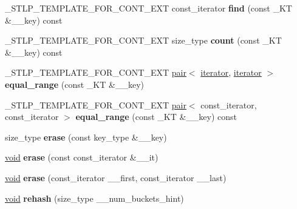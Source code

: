 \begin{DoxyCompactItemize}
\+\_\+\+S\+T\+L\+P\+\_\+\+T\+E\+M\+P\+L\+A\+T\+E\+\_\+\+F\+O\+R\+\_\+\+C\+O\+N\+T\+\_\+\+E\+XT const\+\_\+iterator {\bfseries find} (const \+\_\+\+KT \&\+\_\+\+\_\+key) const
\item 
\mbox{\label{classhashtable_af285e0578bbb1cf071b11e26476e820f}} 
\+\_\+\+S\+T\+L\+P\+\_\+\+T\+E\+M\+P\+L\+A\+T\+E\+\_\+\+F\+O\+R\+\_\+\+C\+O\+N\+T\+\_\+\+E\+XT size\+\_\+type {\bfseries count} (const \+\_\+\+KT \&\+\_\+\+\_\+key) const
\item 
\mbox{\label{classhashtable_ac454537f2e28b45372646c382e98984a}} 
\+\_\+\+S\+T\+L\+P\+\_\+\+T\+E\+M\+P\+L\+A\+T\+E\+\_\+\+F\+O\+R\+\_\+\+C\+O\+N\+T\+\_\+\+E\+XT \hyperlink{structpair}{pair}$<$ \hyperlink{structiterator}{iterator}, \hyperlink{structiterator}{iterator} $>$ {\bfseries equal\+\_\+range} (const \+\_\+\+KT \&\+\_\+\+\_\+key)
\item 
\mbox{\label{classhashtable_a79fe7edebd28031966c8f5f57ea86145}} 
\+\_\+\+S\+T\+L\+P\+\_\+\+T\+E\+M\+P\+L\+A\+T\+E\+\_\+\+F\+O\+R\+\_\+\+C\+O\+N\+T\+\_\+\+E\+XT \hyperlink{structpair}{pair}$<$ const\+\_\+iterator, const\+\_\+iterator $>$ {\bfseries equal\+\_\+range} (const \+\_\+\+KT \&\+\_\+\+\_\+key) const
\item 
\mbox{\label{classhashtable_a566bcb7cde220487dacde9f003b30cfe}} 
size\+\_\+type {\bfseries erase} (const key\+\_\+type \&\+\_\+\+\_\+key)
\item 
\mbox{\label{classhashtable_a59cb9f10ea00af6cbe8b687e2d1330ee}} 
\hyperlink{interfacevoid}{void} {\bfseries erase} (const const\+\_\+iterator \&\+\_\+\+\_\+it)
\item 
\mbox{\label{classhashtable_a91aa73feb515a86fd2c92213d5bbba14}} 
\hyperlink{interfacevoid}{void} {\bfseries erase} (const\+\_\+iterator \+\_\+\+\_\+first, const\+\_\+iterator \+\_\+\+\_\+last)
\item 
\mbox{\label{classhashtable_ac9659e48cdb2f5d1c6ea1a15e25c41c0}} 
\hyperlink{interfacevoid}{void} {\bfseries rehash} (size\+\_\+type \+\_\+\+\_\+num\+\_\+buckets\+\_\+hint)
\item 
\mbox{\label{classhashtable_a5c09ca7d9e6c433a14965bd839f8d09d}} 

\end{DoxyCompactItemize}
